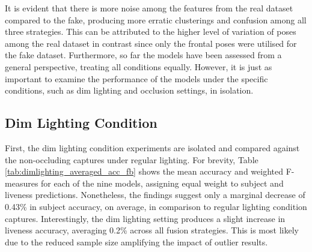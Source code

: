 \documentclass{mpaper}
\begin{document}
It is evident that there is more noise among the features from the real dataset compared to the fake, producing more erratic clusterings and confusion among all three strategies. This can be attributed to the higher level of variation of poses among the real dataset in contrast since only the frontal poses were utilised for the fake dataset. Furthermore, so far the models have been assessed from a general perspective, treating all conditions equally. However, it is just as important to examine the performance of the models under the specific conditions, such as dim lighting and occlusion settings, in isolation.


\subsection{Dim Lighting Condition}
First, the dim lighting condition experiments are isolated and compared against the non-occluding captures under regular lighting. For brevity, Table \ref{tab:dimlighting_averaged_acc_fb} shows the mean accuracy and weighted F-measures for each of the nine models, assigning equal weight to subject and liveness predictions. Nonetheless, the findings suggest only a marginal decrease of 0.43\% in subject accuracy, on average, in comparison to regular lighting condition captures. Interestingly, the dim lighting setting produces a slight increase in liveness accuracy, averaging 0.2\% across all fusion strategies. This is most likely due to the reduced sample size amplifying the impact of outlier results. 
\end{document}
